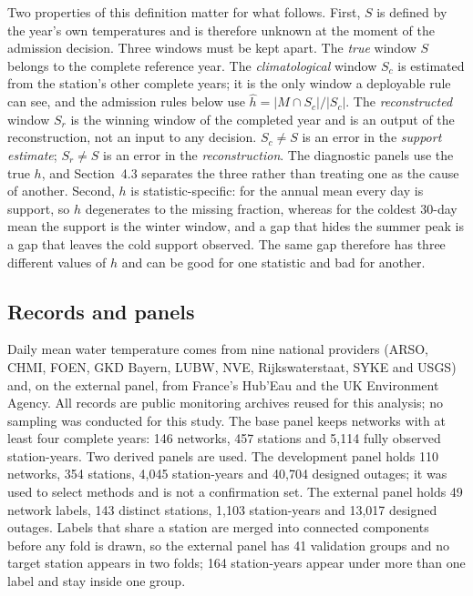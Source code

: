 \documentclass[draft]{agujournal2025}
\begin{document}
Two properties of this definition matter for what follows. First, $S$ is
defined by the year's own temperatures and is therefore unknown at the moment of
the admission decision. Three windows must be kept apart. The \emph{true} window
$S$ belongs to the complete reference year. The \emph{climatological} window
$S_c$ is estimated from the station's other complete years; it is the only
window a deployable rule can see, and the admission rules below use
$\hat h=|M\cap S_c|/|S_c|$. The \emph{reconstructed} window $S_r$ is the winning
window of the completed year and is an output of the reconstruction, not an
input to any decision. $S_c\neq S$ is an error in the \emph{support estimate};
$S_r\neq S$ is an error in the \emph{reconstruction}. The diagnostic panels use
the true $h$, and Section~4.3 separates the three rather than treating one as
the cause of another. Second, $h$ is
statistic-specific: for the annual mean every day is support, so $h$ degenerates
to the missing fraction, whereas for the coldest 30-day mean the support is the
winter window, and a gap that hides the summer peak is a gap that leaves the
cold support observed. The same gap therefore has three different values of $h$
and can be good for one statistic and bad for another.

\subsection{Records and panels}

Daily mean water temperature comes from nine national providers (ARSO, CHMI,
FOEN, GKD Bayern, LUBW, NVE, Rijkswaterstaat, SYKE and USGS) and, on the
external panel, from France's Hub'Eau and the UK Environment Agency. All records
are public monitoring archives reused for this analysis; no sampling was
conducted for this study. The base panel keeps networks with at least four
complete years: 146 networks, 457 stations and 5{,}114 fully observed
station-years. Two derived panels are used. The development panel holds 110
networks, 354 stations, 4{,}045 station-years and 40{,}704 designed outages; it
was used to select methods and is not a confirmation set. The external panel
holds 49 network labels, 143 distinct stations, 1{,}103 station-years and
13{,}017 designed outages. Labels that share a station are merged into
connected components before any fold is drawn, so the external panel has 41
validation groups and no target station appears in two folds; 164 station-years
appear under more than one label and stay inside one group.
\end{document}
